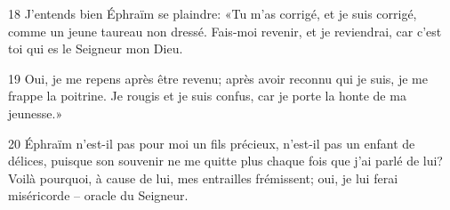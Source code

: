 
18 J’entends bien Éphraïm se plaindre: «Tu m’as corrigé, et je suis corrigé, comme un jeune taureau non dressé. Fais-moi revenir, et je reviendrai, car c’est toi qui es le Seigneur mon Dieu.

19 Oui, je me repens après être revenu; après avoir reconnu qui je suis, je me frappe la poitrine. Je rougis et je suis confus, car je porte la honte de ma jeunesse.»

20 Éphraïm n’est-il pas pour moi un fils précieux, n’est-il pas un enfant de délices, puisque son souvenir ne me quitte plus chaque fois que j’ai parlé de lui? Voilà pourquoi, à cause de lui, mes entrailles frémissent; oui, je lui ferai miséricorde – oracle du Seigneur.
